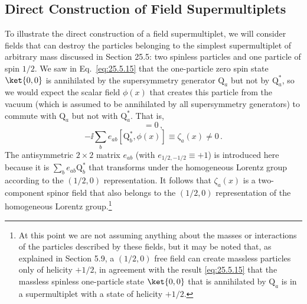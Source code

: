 
\subsection{Direct Construction of Field Supermultiplets}

\providecommand{\WeylQ}{\mathrm{Q}}
\providecommand{\MajoranaQ}{Q}

To illustrate the direct construction of a field supermultiplet, we will
consider fields that can destroy the particles belonging to the simplest
supermultiplet of arbitrary mass discussed in Section 25.5: two spinless
particles and one particle of spin \(1/2\). We saw in
Eq.~\eqref{eq:25.5.15} that the one-particle zero spin state \(\ket{0,0}\) is
annihilated by the supersymmetry generator \(\WeylQ_a\) but not by
\(\WeylQ_a^*\), so we would expect the scalar field \(\phi(x)\) that creates
this particle from the vacuum (which is assumed to be annihilated by all
supersymmetry generators) to commute with \(\WeylQ_a\) but not with
\(\WeylQ_a^*\). That is,
\begin{equation}
  [\WeylQ_a,\phi(x)]=0\,,
  \tag{26.1.1}\label{eq:26.1.1}
\end{equation}
\begin{equation}
  -\ii\sum_b e_{ab}[\WeylQ_b^*,\phi(x)]
  \equiv\zeta_a(x)\ne0\,.
  \tag{26.1.2}\label{eq:26.1.2}
\end{equation}
The antisymmetric \(2\times2\) matrix \(e_{ab}\) (with
\(e_{1/2,-1/2}\equiv+1\)) is introduced here because it is
\(\sum_b e_{ab}\WeylQ_b^*\) that transforms under the homogeneous Lorentz
group according to the \((1/2,0)\) representation. It follows that
\(\zeta_a(x)\) is a two-component spinor field that also belongs to the
\((1/2,0)\) representation of the homogeneous Lorentz group.\footnote{At
this point we are not assuming anything about the masses or interactions of
the particles described by these fields, but it may be noted that, as
explained in Section 5.9, a \((1/2,0)\) free field can create massless
particles only of helicity \(+1/2\), in agreement with the result
\eqref{eq:25.5.15} that the massless spinless one-particle state
\(\ket{0,0}\) that is annihilated by \(\WeylQ_a\) is in a supermultiplet
with a state of helicity \(+1/2\).}


